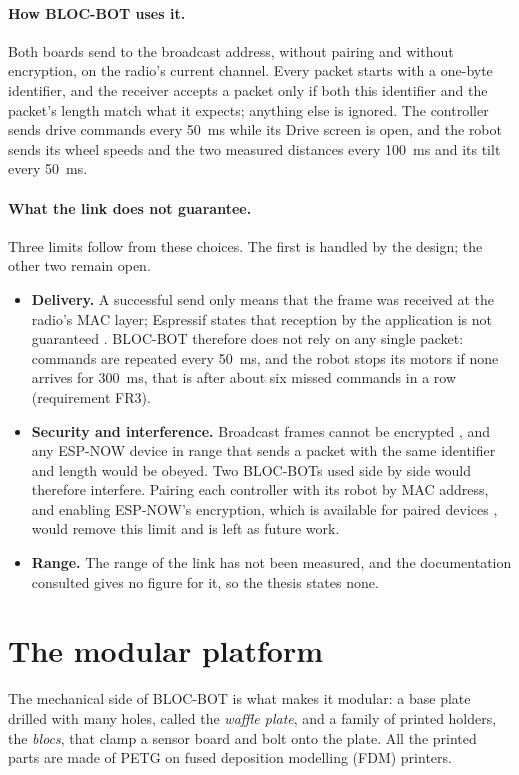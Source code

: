 \paragraph{How BLOC-BOT uses it.} Both boards send to the broadcast address, without
pairing and without encryption, on the radio's current channel. Every packet starts with a
one-byte identifier, and the receiver accepts a packet only if both this identifier and
the packet's length match what it expects; anything else is ignored. The controller sends
drive commands every 50~ms while its Drive screen is open, and the robot sends its wheel
speeds and the two measured distances every 100~ms and its tilt every 50~ms.

\paragraph{What the link does not guarantee.} Three limits follow from these choices. The
first is handled by the design; the other two remain open.
\begin{itemize}
  \item \textbf{Delivery.} A successful send only means that the frame was received at the
        radio's MAC layer; Espressif states that reception by the application is not
        guaranteed \cite{espnow_idf}. BLOC-BOT therefore does not rely on any single
        packet: commands are repeated every 50~ms, and the robot stops its motors if none
        arrives for 300~ms, that is after about six missed commands in a row (requirement
        FR3).
  \item \textbf{Security and interference.} Broadcast frames cannot be encrypted
        \cite{espnow_idf}, and any ESP-NOW device in range that sends a packet with the
        same identifier and length would be obeyed. Two BLOC-BOTs used side by side would
        therefore interfere. Pairing each controller with its robot by MAC address, and
        enabling ESP-NOW's encryption, which is available for paired devices
        \cite{espnow_idf}, would remove this limit and is left as future work.
  \item \textbf{Range.} The range of the link has not been measured, and the
        documentation consulted gives no figure for it, so the thesis states none.
\end{itemize}

\section{The modular platform}
\label{sec:platform}
The mechanical side of BLOC-BOT is what makes it modular: a base plate drilled with many
holes, called the \emph{waffle plate}, and a family of printed holders, the \emph{blocs},
that clamp a sensor board and bolt onto the plate. All the printed parts are made of PETG
on fused deposition modelling (FDM) printers.

